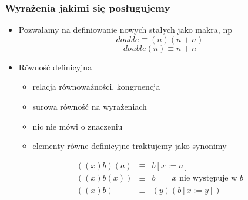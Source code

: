 \documentclass{beamer}
\begin{document}
\begin{frame}
\frametitle{Wyrażenia jakimi się posługujemy}

\begin{itemize}

\item Pozwalamy na definiowanie nowych stałych jako makra, np
\[
 double \equiv (n)(n + n)
\]
\[
 double(n) \equiv n + n
\]


\item Równość definicyjna
\begin{itemize}
 \item relacja równoważności, kongruencja
 \item surowa równość na wyrażeniach
 \item nic nie mówi o znaczeniu
 \item elementy równe definicyjne traktujemy jako synonimy
\end{itemize}

\begin{eqnarray*}
((x)b)(a) & \equiv & b[x := a]
\\
 ((x)b(x)) &\equiv& b \qquad \mbox{$x$ nie występuje w $b$}
\\
  ((x)b) & \equiv& (y)(b[x := y])
\end{eqnarray*}

\end{itemize}

\end{frame}

\end{document}
